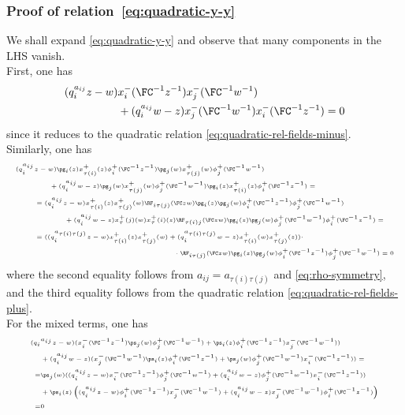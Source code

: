 \documentclass[reqno]{amsart}
\numberwithin{equation}{section}
\begin{document}
\subsubsection{Proof of relation~\eqref{eq:quadratic-y-y}}\label{sss:QSP-quadratic-rel}
We shall expand \eqref{eq:quadratic-y-y} and observe that many components in the LHS vanish.\\
First, one has
\begin{align}\label{eq:quadratic-A}
(q_i^{a_{ij}}z-w)&x^-_i(\FC^{-1}z^{-1})x^-_j(\FC^{-1}w^{-1})\\
&+(q_i^{a_{ij}}w-z)x^-_j(\FC^{-1}w^{-1})x^-_i(\FC^{-1}z^{-1})=0	
\end{align}
since it reduces to the quadratic relation \eqref{eq:quadratic-rel-fields-minus}.\\
Similarly, one has
\begin{equation}\label{eq:quadratic-B}
\tiny
\begin{split}
	(q_i^{a_{ij}}&z-w)\pg_i(z)x^+_{\tau(i)}(z)\phi^+_i(\FC^{-1}z^{-1})
	\pg_j(w)x^+_{\tau(j)}(w)\phi^+_j(\FC^{-1}w^{-1})\\
	&\qquad+(q_i^{a_{ij}}w-z)\pg_j(w)x^+_{\tau(j)}(w)\phi^+_j(\FC^{-1}w^{-1})\pg_i(z)x^+_{\tau(i)}(z)\phi^+_i(\FC^{-1}z^{-1})=\\
	&=(q_i^{a_{ij}}z-w)x^+_{\tau(i)}(z)	x^+_{\tau(j)}(w)
	\RF_{i\tau(j)}(\FC zw)\pg_i(z)\pg_j(w)\phi^+_i(\FC^{-1}z^{-1})\phi^+_j(\FC^{-1}w^{-1})\\
	&\qquad\qquad+(q_i^{a_{ij}}w-z)x^+_\tau(j)(w)x^+_\tau(i)(z)
	\RF_{\tau(i)j}(\FC zw)\pg_i(z)\pg_j(w)\phi^+_j(\FC^{-1}w^{-1})\phi^+_i(\FC^{-1}z^{-1})=\\
	&=((q_i^{a_{\tau(i)\tau(j)}}z-w)x^+_{\tau(i)}(z)	x^+_{\tau(j)}(w)
	+(q_i^{a_{\tau(i)\tau(j)}}w-z)x^+_{\tau(i)}(w)x^+_{\tau(j)}(z))\cdot\\
	&\hspace{4.45cm}\cdot
	\RF_{i\tau(j)}(\FC zw)\pg_i(z)\pg_j(w)\phi^+_i(\FC^{-1}z^{-1})\phi^+_j(\FC^{-1}w^{-1})=0
\end{split}
\end{equation}
where the second equality follows from $a_{ij}=a_{\tau(i)\tau(j)}$ and \eqref{eq:rho-symmetry}, and the third equality follows from the quadratic relation \eqref{eq:quadratic-rel-fields-plus}.\\
For the mixed terms, one has
\begin{equation}\label{eq:quadratic-AC}
\tiny
\begin{split}
(q_i&^{a_{ij}}z-w)
(x_i^-(\FC^{-1}z^{-1})\ps_j(w)\phi^+_j(\FC^{-1}w^{-1})+\ps_i(z)\phi^+_i(\FC^{-1}z^{-1})x_j^-(\FC^{-1}w^{-1}))\\
&+(q_i^{a_{ij}}w-z)
(x_j^-(\FC^{-1}w^{-1})\ps_i(z)\phi^+_i(\FC^{-1}z^{-1})+\ps_j(w)\phi^+_j(\FC^{-1}w^{-1})x_i^-(\FC^{-1}z^{-1}))=\\
=&\ps_j(w)((q_i^{a_{ij}}z-w)
x_i^-(\FC^{-1}z^{-1})\phi^+_j(\FC^{-1}w^{-1})
+(q_i^{a_{ij}}w-z)\phi^+_j(\FC^{-1}w^{-1})x_i^-(\FC^{-1}z^{-1}))\\
&+\ps_i(z)\left((q_i^{a_{ij}}z-w) \phi^+_i(\FC^{-1}z^{-1})x_j^-(\FC^{-1}w^{-1}) +(q_i^{a_{ij}}w-z)
x_j^-(\FC^{-1}w^{-1})\phi^+_i(\FC^{-1}z^{-1})\right)\\
=&0
\end{split}
\end{equation}
\end{document}
